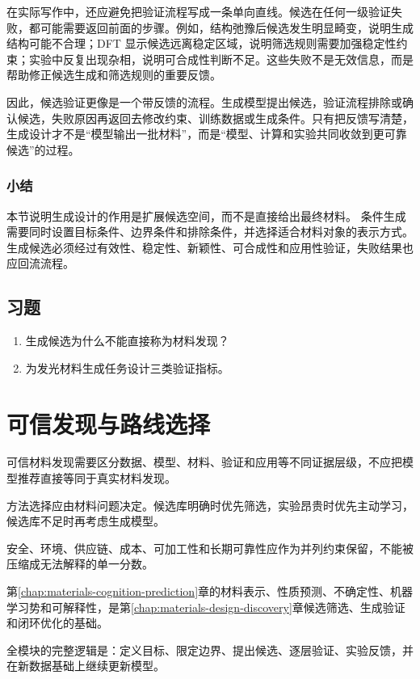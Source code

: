 在实际写作中，还应避免把验证流程写成一条单向直线。候选在任何一级验证失败，都可能需要返回前面的步骤。例如，结构弛豫后候选发生明显畸变，说明生成结构可能不合理；DFT 显示候选远离稳定区域，说明筛选规则需要加强稳定性约束；实验中反复出现杂相，说明可合成性判断不足。这些失败不是无效信息，而是帮助修正候选生成和筛选规则的重要反馈。

因此，候选验证更像是一个带反馈的流程。生成模型提出候选，验证流程排除或确认候选，失败原因再返回去修改约束、训练数据或生成条件。只有把反馈写清楚，生成设计才不是“模型输出一批材料”，而是“模型、计算和实验共同收敛到更可靠候选”的过程。

\subsubsection*{\textbf{小结}}

本节说明生成设计的作用是扩展候选空间，而不是直接给出最终材料。
条件生成需要同时设置目标条件、边界条件和排除条件，并选择适合材料对象的表示方式。
生成候选必须经过有效性、稳定性、新颖性、可合成性和应用性验证，失败结果也应回流流程。

\subsection*{习题}

\begin{enumerate}[leftmargin=*]
\item 生成候选为什么不能直接称为材料发现？
\item 为发光材料生成任务设计三类验证指标。
\end{enumerate}

\clearpage
\section{可信发现与路线选择}


\begin{sectionkeypoints}
\item 可信材料发现需要区分数据、模型、材料、验证和应用等不同证据层级，不应把模型推荐直接等同于真实材料发现。
\item 方法选择应由材料问题决定。候选库明确时优先筛选，实验昂贵时优先主动学习，候选库不足时再考虑生成模型。
\item 安全、环境、供应链、成本、可加工性和长期可靠性应作为并列约束保留，不能被压缩成无法解释的单一分数。
\item 第\ref{chap:materials-cognition-prediction}章的材料表示、性质预测、不确定性、机器学习势和可解释性，是第\ref{chap:materials-design-discovery}章候选筛选、生成验证和闭环优化的基础。
\item 全模块的完整逻辑是：定义目标、限定边界、提出候选、逐层验证、实验反馈，并在新数据基础上继续更新模型。
\end{sectionkeypoints}

